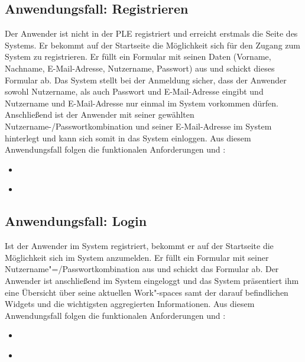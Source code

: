 \subsection{Anwendungsfall: Registrieren}
Der Anwender ist nicht in der \ac{PLE} registriert und erreicht erstmals die Seite des Systems. Er bekommt auf der Startseite die Möglichkeit sich für den Zugang zum System zu registrieren. Er füllt ein Formular mit seinen Daten (Vorname, Nachname, E-Mail-Adresse, Nutzername, Passwort) aus und schickt dieses Formular ab. Das System stellt bei der Anmeldung sicher, dass der Anwender sowohl Nutzername, als auch Passwort und E-Mail-Adresse eingibt und Nutzername und E-Mail-Adresse nur einmal im System vorkommen dürfen. Anschließend ist der Anwender mit seiner gewählten Nutzername-/Passwortkombination und seiner E-Mail-Adresse im System hinterlegt und kann sich somit in das System einloggen. Aus diesem Anwendungsfall folgen die funktionalen Anforderungen  und :\\
\begin{itemize}
 \item \requirementf{\requirementRegistrieren}\label{requirementRegistrieren}
 \item \requirementf{\requirementUniqueLoginEmail}\label{requirementUniqueLoginEmail}
\end{itemize}
 
\subsection{Anwendungsfall: Login}
Ist der Anwender im System registriert, bekommt er auf der Startseite die Möglichkeit sich im System anzumelden. Er füllt ein Formular mit seiner Nutzername"=/Passwortkombination aus und schickt das Formular ab. Der Anwender ist anschließend im System eingeloggt und das System präsentiert ihm eine Übersicht über seine aktuellen Work"-spaces samt der darauf befindlichen Widgets und die wichtigsten aggregierten Informationen. Aus diesem Anwendungsfall folgen die funktionalen Anforderungen  und :
\begin{itemize}
 \item \requirementf{\requirementLogin}\label{requirementLogin}
 \item \requirementf{\requirementZugriffAufEigeneWidgets}\label{requirementZugriffAufEigeneWidgets}
\end{itemize}

